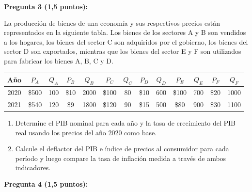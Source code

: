 \documentclass[11pt,addpoints]{article}
\begin{document}
\vspace{0.3cm}
\textbf{Pregunta 3 (1,5 puntos):}  

La producción de bienes de una economía y sus respectivos precios están representados en la siguiente tabla. Los bienes de los sectores A y B son vendidos a los hogares, los bienes del sector C son adquiridos por el gobierno, los bienes del sector D son exportados, mientras que los bienes del sector E y F son utilizados para fabricar los bienes A, B, C y D.  

\begin{center}
\begin{tabular}{c c c c c c c c c c c c c}
\toprule
\textbf{Año} & $P_A$ & $Q_A$ & $P_B$ & $Q_B$ & $P_C$ & $Q_C$ & $P_D$ & $Q_D$ & $P_E$ & $Q_E$ & $P_F$ & $Q_F$ \\
\midrule
2020 & \$500 & 100 & \$10 & 2000 & \$100 & 80 & \$10 & 600 & \$100 & 700 & \$20 & 1000 \\
2021 & \$540 & 120 & \$9 & 1800 & \$120 & 90 & \$15 & 500 & \$80  & 900 & \$30  & 1100  \\
\bottomrule
\end{tabular}
\end{center}

\begin{enumerate}[label=\alph*)]
    \item Determine el PIB nominal para cada año y la tasa de crecimiento del PIB real usando los precios del año 2020 como base.  
    \item Calcule el deflactor del PIB e índice de precios al consumidor para cada período y luego compare la tasa de inflación medida a través de ambos indicadores.  
\end{enumerate}

\vspace*{0.1cm}

\textbf{Pregunta  4 (1,5 puntos):}  
\end{document}
